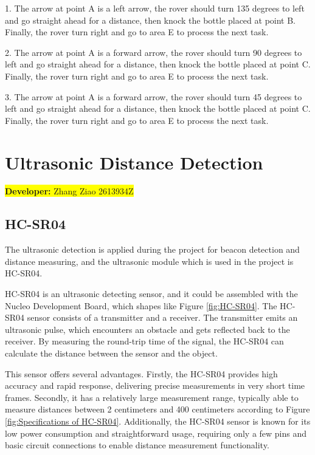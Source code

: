 \documentclass[12pt, a4paper, oneside]{report}
\begin{document}
1. The arrow at point A is a left arrow, the rover should turn 135 degrees to left and go straight ahead for a distance, then knock the bottle placed at point B. Finally, the rover turn right and go to area E to process the next task.

2. The arrow at point A is a forward arrow, the rover should turn 90 degrees to left and go straight ahead for a distance, then knock the bottle placed at point C. Finally, the rover turn right and go to area E to process the next task.

3. The arrow at point A is a forward arrow, the rover should turn 45 degrees to left and go straight ahead for a distance, then knock the bottle placed at point C. Finally, the rover turn right and go to area E to process the next task.

\newpage
\section{Ultrasonic Distance Detection}\label{sec:SR-04}
\colorbox{yellow}{\textbf{Developer:} Zhang Ziao 2613934Z}

\subsection{HC-SR04}
	
The ultrasonic detection is applied during the project for beacon detection and distance measuring, and the ultrasonic module which is used in the project is HC-SR04. 
	
HC-SR04 is an ultrasonic detecting sensor, and it could be assembled with the Nucleo Development Board, which shapes like Figure \ref{fig:HC-SR04}. The HC-SR04 sensor consists of a transmitter and a receiver. The transmitter emits an ultrasonic pulse, which encounters an obstacle and gets reflected back to the receiver. By measuring the round-trip time of the signal, the HC-SR04 can calculate the distance between the sensor and the object.

This sensor offers several advantages. Firstly, the HC-SR04 provides high accuracy and rapid response, delivering precise measurements in very short time frames. Secondly, it has a relatively large measurement range, typically able to measure distances between 2 centimeters and 400 centimeters according to Figure \ref{fig:Specifications of HC-SR04}. Additionally, the HC-SR04 sensor is known for its low power consumption and straightforward usage, requiring only a few pins and basic circuit connections to enable distance measurement functionality.
\end{document}
